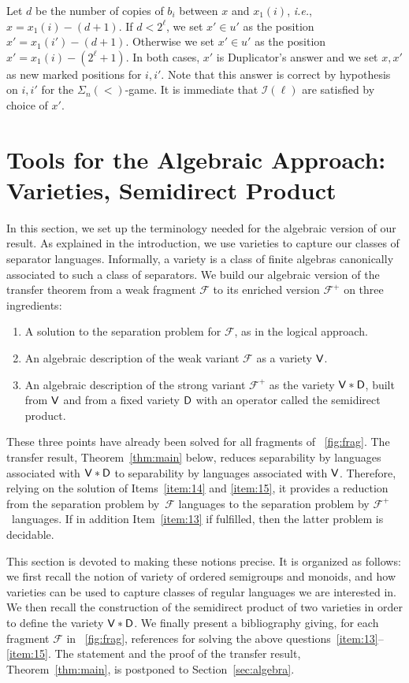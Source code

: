 \documentclass[a4paper,USenglish]{lipics}
\newcommand\itemfmt[1]{\textcolor{darkgray}{\sffamily\bfseries\mathversion{bold}{#1}}}
\newcommand\itemref[1]{\textcolor{linkcolor}{\sffamily{#1}}}
\newcommand\Fs{\ensuremath{\mathcal{F}}\xspace}
\newcommand\Is{\ensuremath{\mathcal{I}}\xspace}
\newcommand\Vbf{\ensuremath{{\sf V}}\xspace}
\newcommand\Dbf{\ensuremath{{\sf D}}\xspace}
\newcommand{\sio}[1]{\ensuremath{\Sigma_{#1}(<)}\xspace}
\theoremstyle{plain}
\begin{document}
\smallskip

Let $d$ be the number of copies of $b_i$ between $x$ and $x_1(i)$, \emph{i.e.},
$x = x_1(i) - (d+1)$. If $d < 2^\ell$, we set $x' \in u'$ as the position
$x' = x_1(i') - (d+1)$. Otherwise we set $x' \in u'$ as the position
$x' = x_1(i) - (2^\ell+1)$. In both cases, $x'$ is Duplicator's answer and we
set $x,x'$ as new marked positions for $i,i'$. Note that this answer is
correct by hypothesis on $i,i'$ for the \sio{n}-game. It is immediate that
$\Is(\ell)$ are satisfied by choice of $x'$.


\section{Tools for the Algebraic Approach: Varieties, Semidirect Product}
\label{sec:tools-algebr-appr}

In this section, we set up the terminology needed for the algebraic version of
our result. As explained in the introduction, we use varieties to capture our
classes of separator languages. Informally, a variety is a class of finite
algebras canonically associated to such a class of separators. We build our
algebraic version of the transfer theorem from a weak fragment \Fs to its enriched
version $\Fs^+$ on three ingredients:
\begin{enumerate}[label=\itemfmt{I\arabic*.},ref=\itemref{I\arabic*}]
\item\label{item:13} A solution to the separation problem for \Fs, as in the logical approach.
\item\label{item:14} An algebraic description of the weak variant \Fs as a variety \Vbf.
\item\label{item:15} An algebraic description of the strong variant $\Fs^+$ as the variety $\Vbf * \Dbf$, built from $\Vbf$ and from a fixed variety $\Dbf$ with an
  operator called the semidirect product.
\end{enumerate}
These three points have already been solved for all fragments of
\figurename~\ref{fig:frag}. The transfer result, Theorem~\ref{thm:main} below,
reduces separability by languages associated with $\Vbf * \Dbf$ to
separability by languages associated with $\Vbf$. Therefore, relying on the
solution of Items~\ref{item:14} and \ref{item:15}, it provides a
reduction from the separation problem by~\Fs languages to
the separation problem by $\Fs^+$~languages. If in addition Item~\ref{item:13}
if fulfilled, then the latter problem is decidable.

\medskip
This section is devoted to making these notions precise. It is organized as
follows: we first recall the notion of variety of ordered semigroups and
monoids, and how varieties can be used to capture classes of regular languages
we are interested in. We then recall the construction of the semidirect
product of two varieties in order to define the variety $\Vbf * \Dbf$.  We
finally present a bibliography giving, for each fragment $\Fs$ in
\figurename~\ref{fig:frag}, references for solving the above
questions~\ref{item:13}--\ref{item:15}. The statement and the proof of the transfer result,
Theorem~\ref{thm:main}, is postponed to Section~\ref{sec:algebra}.
\end{document}
